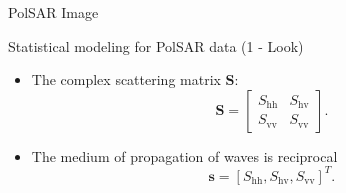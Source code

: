 \documentclass[10pt]{beamer}
\begin{document}

\begin{frame}[fragile]{PolSAR Image}
\begin{alertblock}{Statistical modeling for PolSAR data (1 - Look)}
\begin{itemize}
\item The complex scattering matrix $\mathbf{S}$:
\begin{equation}
\mathbf{S} = \left[
\begin{array}{cc}
	S_\text{hh}   & S_\text{hv}   \\
	S_\text{vv}   & S_\text{vv}   
\end{array}
\right].
\end{equation}\label{eq_01}
\item The medium of propagation of waves is reciprocal
$$\mathbf{s}=[S_\text{hh},S_\text{hv},S_{\text{vv}}]^T.$$
\end{itemize}
\end{alertblock}
\end{frame}
\end{document}
